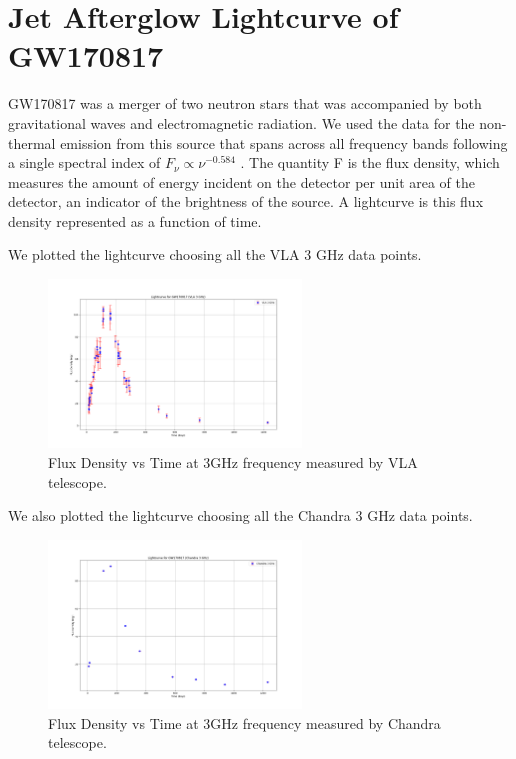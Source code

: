 \clearpage

\section{Jet Afterglow Lightcurve of GW170817}

GW170817\cite{gw170817_afterglow} was a merger of two neutron stars that was accompanied by both gravitational waves and electromagnetic radiation. We used the data for the non-thermal emission from this source that spans across all frequency bands following a single spectral index of $F_{\nu} \propto {\nu}^{-0.584}$ . The quantity F is the flux density, which measures the amount of energy incident on the detector per unit area of the detector, an indicator of the brightness of the source. A lightcurve is this flux density represented as a function of time. 

We plotted the lightcurve choosing all the VLA 3 GHz data points.

\begin{figure}[H]
    \centering
    \includegraphics[width=0.6\textwidth]{Images/vla_lightcurve.png}
    \caption{Flux Density vs Time at 3GHz frequency measured by VLA telescope.}
    \label{fig:vla_lightcurve}
\end{figure}

\vspace{10mm}

We also plotted the lightcurve choosing all the Chandra 3 GHz data points.

\begin{figure}[H]
    \centering
    \includegraphics[width=0.6\textwidth]{Images/chandra_lightcurve.png}
    \caption{Flux Density vs Time at 3GHz frequency measured by Chandra telescope.}
    \label{fig:chandra_lightcurve}
\end{figure}


